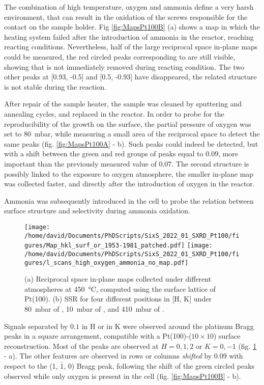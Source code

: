 The combination of high temperature, oxygen and ammonia define a very harsh environment, that can result in the oxidation of the screws responsible for the contact on the sample holder.
Fig \ref{fig:MapsPt100B} (a) shows a map in which the heating system failed after the introduction of ammonia in the reactor, reaching reacting conditions.
Nevertheless, half of the large reciprocal space in-plane maps could be measured, the red circled peaks corresponding to  are still visible, showing that  is not immediately removed during reacting condition.
The two other peaks at [0.93, -0.5] and [0.5, -0.93] have disappeared, the related structure is not stable during the reaction.

After repair of the sample heater, the sample was cleaned by sputtering and annealing cycles, and replaced in the reactor.
In order to probe for the reproducibility of the  growth on the surface, the partial pressure of oxygen was set to \qty{80}{\milli\bar}, while measuring a small area of the reciprocal space to detect the same peaks (fig. \ref{fig:MapsPt100A} - b).
Such peaks could indeed be detected, but with a shift between the green and red groups of peaks equal to $0.09$, more important than the previously measured value of $0.07$.
The second structure is possibly linked to the exposure to oxygen atmosphere, the smaller in-plane map was collected faster, and directly after the introduction of oxygen in the reactor.

Ammonia was subsequently introduced in the cell to probe the relation between surface structure and selectivity during ammonia oxidation.

\begin{figure}[!htb]
    \centering
    \texttt{[image: /home/david/Documents/PhDScripts/SixS\_2022\_01\_SXRD\_Pt100/figures/Map\_hkl\_surf\_or\_1953-1981\_patched.pdf]}
    \texttt{[image: /home/david/Documents/PhDScripts/SixS\_2022\_01\_SXRD\_Pt100/figures/l\_scans\_high\_oxygen\_ammonia\_no\_map.pdf]}
    \caption{
        (a) Reciprocal space in-plane maps collected under different atmospheres at \qty{450}{\degreeCelsius}, computed using the surface lattice of Pt(100).
        (b) SSR for four different positions in [H, K] under \qty{80}{\milli\bar} of , \qty{10}{\milli\bar} of , and \qty{410}{\milli\bar} of .
    }
    \label{fig:MapsAndLScansPt100HighOxAmmonia}
\end{figure}

Signals separated by $0.1$ in H or in K were observed around the platinum Bragg peaks in a square arrangement, compatible with a Pt(100)-($10\times10$) surface reconstruction.
Most of the peaks are observed at $H={0,1,2}$ or $K={0, -1}$ (fig. \ref{fig:MapsAndLScansPt100HighOxAmmonia} - a).
The other features are observed in rows or columns \textit{shifted} by $0.09$ with respect to the (1, $\bar{1}$, 0) Bragg peak, following the shift of the green circled peaks observed while only oxygen is present in the cell (fig. \ref{fig:MapsPt100B} - b).

